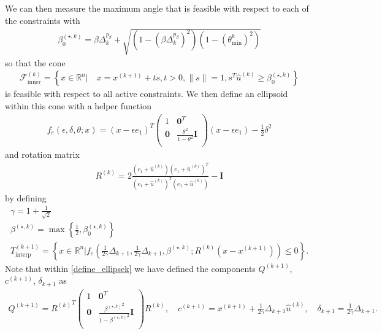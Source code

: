 \documentclass{article}
\theoremstyle{case}
\numberwithin{theorem}{subsection}
\newcommand{\bs}{{\beta^{(\star, k)}}}
\newcommand{\bsk}{{\beta_0^{(\star, k)}}}
\newcommand{\dk}{\Delta_k}
\newcommand{\dkpo}{\Delta_{k+1}}
\newcommand{\fcki}{{\mathcal {F}^{(k)}_{\textrm{inner}}}}
\newcommand{\huk}{{{\hat u}^{(k)}}}
\newcommand{\Rn}{\mathbb R^n}
\newcommand{\rotk}{{R^{(k)}}}
\newcommand{\sampletrkpo}{{T_{\text{interp}}^{(k+1)}}}
\newcommand{\thetamink}{{\theta^k_{\textrm{min}}}}
\newcommand{\xkpo}{{{x}^{(k+1)}}}
\newcommand{\qkpo}{{Q^{(k+1)}}}
\newcommand{\ckpo}{{c^{(k+1)}}}
\newcommand{\sdkpo}{{\delta_{k+1}}}
\begin{document}
We can then measure the maximum angle that is feasible with respect to each of the constraints with
\begin{align}
\bsk = \beta\dk^{p_{\beta}} + \sqrt{\left(1 - \left(\beta\dk^{p_{\beta}}\right)^2\right)\left(1 - \left(\thetamink\right) ^2\right)} \label{define_bsk}
\end{align}
so that the cone
\begin{align}
\fcki = \left\{x \in \Rn \bigg| \quad x = \xkpo + ts, t > 0, \|s\| = 1, s^T\huk \ge \bsk \right\} \label{define_inner_cone}
\end{align}
is feasible with respect to all active constraints.
We then define an ellipsoid within this cone with a helper function
\begin{align}
f_e(\epsilon, \delta, \theta; x) = (x - \epsilon e_1)^T\begin{pmatrix}
1 & \boldsymbol0^T \\
\boldsymbol 0 & \frac{\theta^2}{1 - \theta^2} \boldsymbol I \\
\end{pmatrix}(x - \epsilon e_1) - \frac 1 2 \delta^2 \label{define_ellipse_function}
\end{align}
and rotation matrix
\begin{align}
\rotk = 2\frac{(e_1 + \huk)(e_1 + \huk)^T}{(e_1 + \huk)^T(e_1 + \huk)} - \boldsymbol I \label{define_rotation}
\end{align}
by defining
\begin{align}
\gamma = 1 + \frac 1 {\sqrt{2}} \label{define_the_constant_gamma} \\
\bs = \max\left\{\frac 1 2 , \bsk\right\} \label{define_bs} \\
\sampletrkpo = \left\{x \in \Rn | f_e\left(\frac 1 {2\gamma} \dkpo, \frac 1 {2\gamma} \dkpo,\bs; \rotk(x - \xkpo)\right) \le 0\right\}. \label{define_ellipsek}
\end{align}
Note that within \cref{define_ellipsek} we have defined the components $\qkpo$, $\ckpo$, $\sdkpo$ as
\begin{align*}
\qkpo = \rotk^T \begin{pmatrix}
1 & \boldsymbol0^T \\
\boldsymbol 0 & \frac{\bs^2}{1 - \bs^2} \boldsymbol I \\
\end{pmatrix} \rotk, \quad
\ckpo = \xkpo + \frac 1 {2\gamma} \dkpo \huk, \quad
\sdkpo = \frac 1 {2\gamma} \dkpo.
\end{align*}
\end{document}
